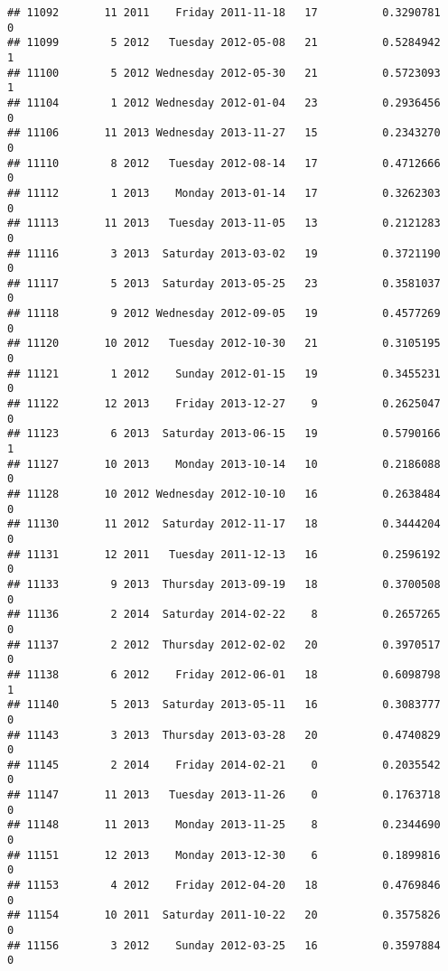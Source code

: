 \documentclass[
]{article}
\begin{document}
\begin{verbatim}
## 11092       11 2011    Friday 2011-11-18   17          0.3290781             0
## 11099        5 2012   Tuesday 2012-05-08   21          0.5284942             1
## 11100        5 2012 Wednesday 2012-05-30   21          0.5723093             1
## 11104        1 2012 Wednesday 2012-01-04   23          0.2936456             0
## 11106       11 2013 Wednesday 2013-11-27   15          0.2343270             0
## 11110        8 2012   Tuesday 2012-08-14   17          0.4712666             0
## 11112        1 2013    Monday 2013-01-14   17          0.3262303             0
## 11113       11 2013   Tuesday 2013-11-05   13          0.2121283             0
## 11116        3 2013  Saturday 2013-03-02   19          0.3721190             0
## 11117        5 2013  Saturday 2013-05-25   23          0.3581037             0
## 11118        9 2012 Wednesday 2012-09-05   19          0.4577269             0
## 11120       10 2012   Tuesday 2012-10-30   21          0.3105195             0
## 11121        1 2012    Sunday 2012-01-15   19          0.3455231             0
## 11122       12 2013    Friday 2013-12-27    9          0.2625047             0
## 11123        6 2013  Saturday 2013-06-15   19          0.5790166             1
## 11127       10 2013    Monday 2013-10-14   10          0.2186088             0
## 11128       10 2012 Wednesday 2012-10-10   16          0.2638484             0
## 11130       11 2012  Saturday 2012-11-17   18          0.3444204             0
## 11131       12 2011   Tuesday 2011-12-13   16          0.2596192             0
## 11133        9 2013  Thursday 2013-09-19   18          0.3700508             0
## 11136        2 2014  Saturday 2014-02-22    8          0.2657265             0
## 11137        2 2012  Thursday 2012-02-02   20          0.3970517             0
## 11138        6 2012    Friday 2012-06-01   18          0.6098798             1
## 11140        5 2013  Saturday 2013-05-11   16          0.3083777             0
## 11143        3 2013  Thursday 2013-03-28   20          0.4740829             0
## 11145        2 2014    Friday 2014-02-21    0          0.2035542             0
## 11147       11 2013   Tuesday 2013-11-26    0          0.1763718             0
## 11148       11 2013    Monday 2013-11-25    8          0.2344690             0
## 11151       12 2013    Monday 2013-12-30    6          0.1899816             0
## 11153        4 2012    Friday 2012-04-20   18          0.4769846             0
## 11154       10 2011  Saturday 2011-10-22   20          0.3575826             0
## 11156        3 2012    Sunday 2012-03-25   16          0.3597884             0

\end{verbatim}
\end{document}
